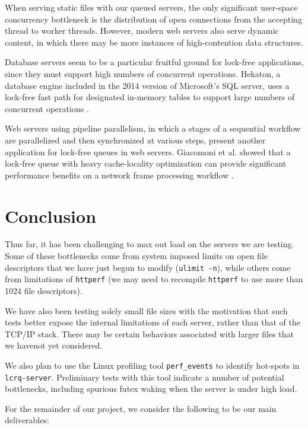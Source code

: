 \documentclass[twoside,10pt]{article}
\begin{document}
\begin{multicols}{2}
When serving static files with our queued servers, the only
significant user-space concurrency bottleneck is the distribution of
open connections from the accepting thread to worker threads. However,
modern web servers also serve dynamic content, in which there may be
more instances of high-contention data structures.

Database servers seem to be a particular fruitful ground for lock-free
applications, since they must support high numbers of concurrent
operations. Hekaton, a database engine included in the 2014 version of
Microsoft's SQL server, uses a lock-free fast path for designated
in-memory tables to support large numbers of concurrent operations
\cite{diaconu2013hekaton}.

Web servers using pipeline parallelism, in which a stages of a
sequential workflow are parallelized and then synchronized at various
steps, present another application for lock-free queues in web
servers. Giacomoni et al. showed that a lock-free queue with heavy
cache-locality optimization can provide significant performance
benefits on a network frame processing workflow
\cite{giacomoni2008fastforward}.

\section{Conclusion}

Thus far, it has been challenging to max out load on the servers we
are testing. Some of these bottlenecks come from system imposed limits
on open file descriptors that we have just begun to modify
(\verb+ulimit -n+), while others come from limitations of
\verb+httperf+ (we may need to recompile \verb+httperf+ to use more
than 1024 file descriptors).

We have also been testing solely small file sizes with the motivation
that such tests better expose the internal limitations of each server,
rather than that of the TCP/IP stack. There may be certain behaviors
associated with larger files that we havenot yet considered.

We also plan to use the Linux profiling tool \verb+perf_events+ to
identify hot-spots in \verb+lcrq-server+. Preliminary tests with this
tool indicate a number of potential bottlenecks, including spurious
futex waking when the server is under high load.

For the remainder of our project, we consider the following to be our
main deliverables:


\end{multicols}
\end{document}
